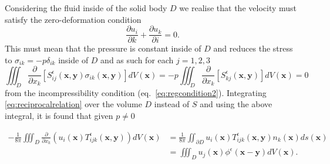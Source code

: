 Considering the fluid inside of the solid body $D$ we realise that the velocity must satisfy the zero-deformation condition
\begin{equation*}
  \frac{\partial u_i}{\partial k} + \frac{\partial u_k}{\partial i} = 0.
\end{equation*}
This must mean that the pressure is constant inside of $D$ and reduces the stress to $\sigma_{ik} = -p\delta_{ik}$ inside of $D$ and as such for each $j=1,2,3$
\begin{equation*}
  \iiint_{D} \frac{\partial}{\partial x_k}\left[S^\epsilon_{ij}\left(\bm{x}, \bm{y}\right)\sigma_{ik}\left(\bm{x}, \bm{y}\right)\right]dV(\bm{x}) = -p\iiint_{D} \frac{\partial}{\partial x_k}\left[S^\epsilon_{kj}\left(\bm{x}, \bm{y}\right)\right]dV(\bm{x}) = 0
\end{equation*}
from the incompressibility condition (eq.~\ref{eq:regcondition2}). Integrating \cref{eq:reciprocalrelation} over the volume $D$ instead of $S$ and using the above integral, it is found that given $p \neq 0$

\begin{equation}
\begin{aligned}
    \label{eq:BIE4}
    -\frac{1}{8\pi}\iiint_{D} \frac{\partial}{\partial x_k}\left(u_i(\bm{x})T^\epsilon_{ijk}\left(\bm{x}, \bm{y}\right) \right) dV(\bm{x}) &= \frac{1}{8\pi}\iint_{\partial D} u_i(\bm{x})T^\epsilon_{ijk}\left(\bm{x}, \bm{y}\right)n_k(\bm{x}) ds(\bm{x})\\
    &= \iiint_D u_j(\bm{x}) \phi^\epsilon(\bm{x}-\bm{y}) dV(\bm{x}).
\end{aligned}
\end{equation}

